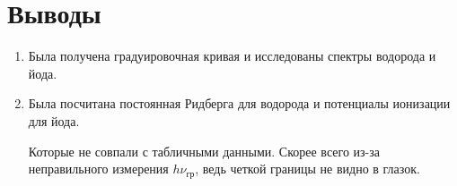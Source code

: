 \documentclass[a4paper,12pt]{article}
\begin{document}
\section{Выводы}

\begin{enumerate}
    \item Была получена градуировочная кривая и исследованы спектры водорода и йода.
    \item Была посчитана постоянная Ридберга для водорода и потенциалы ионизации для йода. 

    Которые не совпали с табличными данными. Скорее всего из-за неправильного измерения $h \nu_{\text{гр}}$, ведь четкой границы не видно в глазок.
\end{enumerate}
\end{document}
